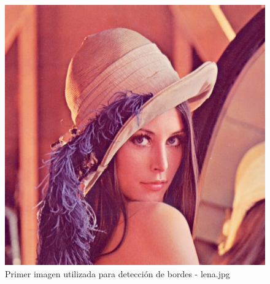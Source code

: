 \documentclass[11pt, a4paper]{article}
\begin{document}
\begin{figure}[ht] %
\centering
\includegraphics[scale=0.25]{lena.jpg}
\caption{Primer imagen utilizada para detecci\'on de bordes - lena.jpg}
\end{figure}

\vspace{3cm}
\end{document}
